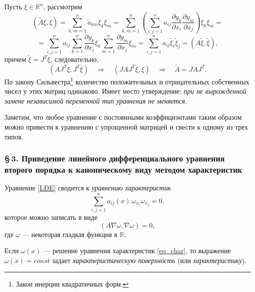 \documentclass[12pt,a5paper]{book}
\begin{document}
	Пусть $\xi \in \mathbb{R}^n$, рассмотрим
	\begin{equation*}
		\left(\tilde{A}\xi, \xi\right) = \sum_{k,m=1}^{n}\tilde{a}_{km}\xi_{k}\xi_{m} = \sum_{k,m=1}^{n}\left(\sum_{i,j=1}^{n}a_{ij}\frac{\partial y_k}{\partial x_i}\frac{\partial y_m}{\partial x_j}\right)\xi_k\xi_m = 
	\end{equation*}
	\begin{equation*}
		= \sum_{i,j=1}^{n}a_{ij}\sum_{k=1}^{n}\frac{\partial y_k}{\partial x_i}\xi_k \sum_{m=1}^{n}\frac{\partial y_m}{\partial x_j}\xi_m = \sum_{i,j=1}^{n}a_{ij}\tilde{\xi}_i\tilde{\xi}_j = \left(A\tilde{\xi}, \tilde{\xi}\right),
	\end{equation*}
	причем $\tilde{\xi} = J^T\xi$, следовательно,
	\begin{equation*}
		\left(AJ^T\xi, J^T\xi\right) \quad \Rightarrow \quad \left(JAJ^T\xi, \xi\right) \quad \Rightarrow \quad \tilde{A} = JAJ^T.
	\end{equation*}
	По закону Сильвестра\footnote{Закон инерции квадратичных форм.} количество положительных и отрицательных собственных чисел у этих матриц одинаково. Имеет место утверждение: \emph{при не вырожденной замене независимой переменной тип уравнения не меняется}.
	
	Заметим, что любое уравнение с постоянными коэффициэнтами таким образом можно привести к уравнению с упрощенной матрицей и свести к одному из трех типов.
	
	\subsubsection*{\S\,3. Приведение линейного дифференциального уравнения второго порядка к каноническому виду методом характеристик}
	
	Уравнение \eqref{LDE} сводится к \emph{уравнению характеристик}
	\begin{equation}\label{eq_char}
		\sum_{i,j=1}^{n}a_{ij}(x)\,\omega_{x_i}\omega_{x_j} = 0,
	\end{equation}
	которое можно записать в виде
	\begin{equation*}
		\left(A \nabla\omega, \nabla\omega\right) = 0,
	\end{equation*}
	где $\omega$ --- некоторая гладкая функция в $\mathbb{R}$.
	
	Если $\omega(x)$ --- решение уравнения характеристик \eqref{eq_char}, то выражение $\omega(x) = const$ задает \emph{характеристическую поверхность} (или \emph{характеристику}).
	
\end{document}
